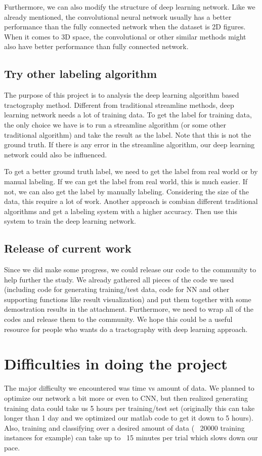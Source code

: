 \documentclass[10pt,twocolumn,letterpaper]{article}
\begin{document}
	Furthermore, we can also modify the structure of deep learning network. Like we already mentioned, the convolutional neural network usually has a better performance than the fully connected network when the dataset is 2D figures. When it comes to 3D space, the convolutional or other similar methods might also have better performance than fully connected network. 
	
	\subsection{Try other labeling algorithm}
	The purpose of this project is to analysis the deep learning algorithm based tractography method. Different from traditional streamline methods, deep learning network needs a lot of training data. To get the label for training data, the only choice we have is to run a streamline algorithm (or some other traditional algorithm) and take the result as the label. Note that this is not the ground truth. If there is any error in the streamline algorithm, our deep learning network could also be influenced.
	
	To get a better ground truth label, we need to get the label from real world or by manual labeling. If we can get the label from real world, this is much easier. If not, we can also get the label by manually labeling. Considering the size of the data, this require a lot of work. Another approach is combian different traditional algorithms and get a labeling system with a higher accuracy. Then use this system to train the deep learning network.
	
	\subsection{Release of current work}
	Since we did make some progress, we could release our code to the community to help further the study. We already gathered all pieces of the code we used (including code for generating training/test data, code for NN and other supporting functions like result visualization) and put them together with some demostration results in the attachment. Furthermore, we need to wrap all of the codes and release them to the community. We hope this could be a useful resource for people who wants do a tractography with deep learning approach.
	
	
	\section{Difficulties in doing the project}
	The major difficulty we encountered was time vs amount of data. We planned to optimize our network a bit more or even to CNN, but then realized generating training data could take us 5 hours per training/test set (originally this can take longer than 1 day and we optimized our matlab code to get it down to 5 hours). Also, training and classifying over a desired amount of data (~ 20000 training instances for example) can take up to ~15 minutes per trial which slows down our pace.
	
	
	
	
	{\small
		
		
	}
	
\end{document}
